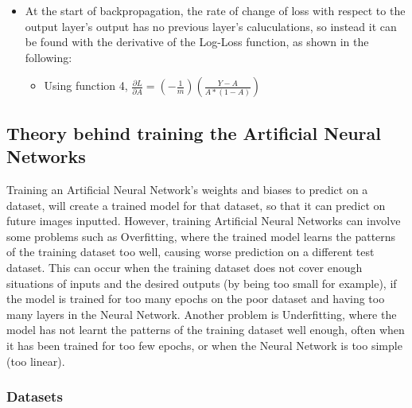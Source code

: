 \documentclass[./project-report/src/latex/project-report.tex]{subfiles}
\begin{document}
\begin{itemize}
\begin{itemize}
    \end{itemize}
    \item At the start of backpropagation, the rate of change of loss with respect to the output layer's output has no previous layer's caluculations, so instead it can 
          be found with the derivative of the Log-Loss function, as shown in the following:
    \begin{itemize}
        \item Using function 4, $\frac{\partial{L}}{\partial{A}} = (-\frac{1}{m})(\frac{Y-A}{A * (1-A)})$
    \end{itemize}
\end{itemize}

\subsection{Theory behind training the Artificial Neural Networks}

Training an Artificial Neural Network's weights and biases to predict on a dataset, will create a trained model for that dataset, so that it can predict on future 
images inputted. However, training Artificial Neural Networks can involve some problems such as Overfitting, where the trained model learns the patterns of the 
training dataset too well, causing worse prediction on a different test dataset. This can occur when the training dataset does not cover enough situations of inputs 
and the desired outputs (by being too small for example), if the model is trained for too many epochs on the poor dataset and having too many layers in the Neural 
Network. Another problem is Underfitting, where the model has not learnt the patterns of the training dataset well enough, often when it has been trained for too few 
epochs, or when the Neural Network is too simple (too linear).

\subsubsection{Datasets}
\vspace{5mm}
\end{document}
